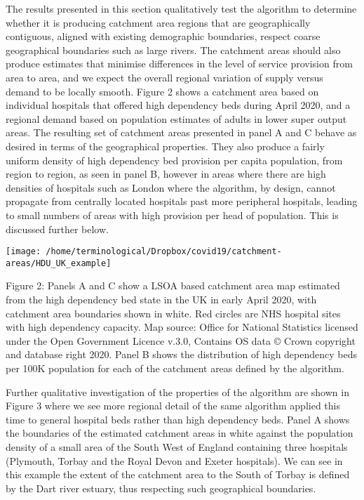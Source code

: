 \documentclass[
]{article}
\begin{document}
The results presented in this section qualitatively test the algorithm
to determine whether it is producing catchment area regions that are
geographically contiguous, aligned with existing demographic boundaries,
respect coarse geographical boundaries such as large rivers. The
catchment areas should also produce estimates that minimise differences
in the level of service provision from area to area, and we expect the
overall regional variation of supply versus demand to be locally smooth.
Figure 2 shows a catchment area based on individual hospitals that
offered high dependency beds during April 2020, and a regional demand
based on population estimates of adults in lower super output areas. The
resulting set of catchment areas presented in panel A and C behave as
desired in terms of the geographical properties. They also produce a
fairly uniform density of high dependency bed provision per capita
population, from region to region, as seen in panel B, however in areas
where there are high densities of hospitals such as London where the
algorithm, by design, cannot propagate from centrally located hospitals
past more peripheral hospitals, leading to small numbers of areas with
high provision per head of population. This is discussed further below.

\begin{center}\texttt{[image: /home/terminological/Dropbox/covid19/catchment-areas/HDU\_UK\_example]} \end{center}

Figure 2: Panels A and C show a LSOA based catchment area map estimated
from the high dependency bed state in the UK in early April 2020, with
catchment area boundaries shown in white. Red circles are NHS hospital
sites with high dependency capacity. Map source: Office for National
Statistics licensed under the Open Government Licence v.3.0, Contains OS
data © Crown copyright and database right 2020. Panel B shows the
distribution of high dependency beds per 100K population for each of the
catchment areas defined by the algorithm.

Further qualitative investigation of the properties of the algorithm are
shown in Figure 3 where we see more regional detail of the same
algorithm applied this time to general hospital beds rather than high
dependency beds. Panel A shows the boundaries of the estimated catchment
areas in white against the population density of a small area of the
South West of England containing three hospitals (Plymouth, Torbay and
the Royal Devon and Exeter hospitals). We can see in this example the
extent of the catchment area to the South of Torbay is defined by the
Dart river estuary, thus respecting such geographical boundaries.
\end{document}
